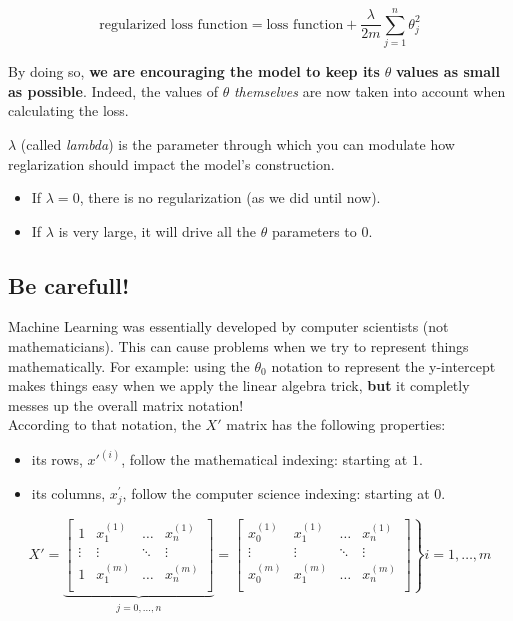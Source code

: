 $$
\text{regularized loss function} = \text{loss function} + \frac{\lambda}{2m} \sum_{j = 1}^n \theta_j^2
$$

By doing so, \textbf{we are encouraging the model to keep its} $\theta$ \textbf{values as small as possible}.
Indeed, the values of $\theta$ \textit{themselves} are now taken into account when calculating the loss.


$\lambda$ (called \textit{lambda}) is the parameter through which you can modulate how reglarization should impact the model's construction.
\begin{itemize}
    \item If $\lambda = 0$, there is no regularization (as we did until now).
    \item If $\lambda$ is very large, it will drive all the $\theta$ parameters to $0$.
\end{itemize}


\subsection*{Be carefull!}
Machine Learning was essentially developed by computer scientists (not mathematicians).
This can cause problems when we try to represent things mathematically.
For example: using the $\theta_0$ notation to represent the y-intercept makes things easy when we apply the linear algebra trick, \textbf{but} it completly messes up the overall matrix notation!\\
According to that notation, the $X'$ matrix  has the following properties: 
\begin{itemize}
    \item its rows, $x'^{(i)}$, follow the mathematical indexing: starting at $1$.
    \item its columns, $x^{'}_j$, follow the computer science indexing: starting at $0$.
\end{itemize}

$$
X' =
\underbrace{
\begin{bmatrix}
1 & x_1^{(1)} & \dots & x_n^{(1)} \\
\vdots & \vdots & \ddots & \vdots \\ 
1 & x_1^{(m)} & \dots & x_n^{(m)} \\ 
\end{bmatrix}  
}_{\begin{matrix}
    j = 0, \dots, n
\end{matrix}}
=     
\left.
\begin{bmatrix}
x_0^{(1)} & x_1^{(1)} & \dots & x_n^{(1)} \\
\vdots & \vdots & \ddots & \vdots \\ 
x_0^{(m)} & x_1^{(m)} & \dots & x_n^{(m)} \\ 
\end{bmatrix}
\right\} i = 1, \dots, m
$$

